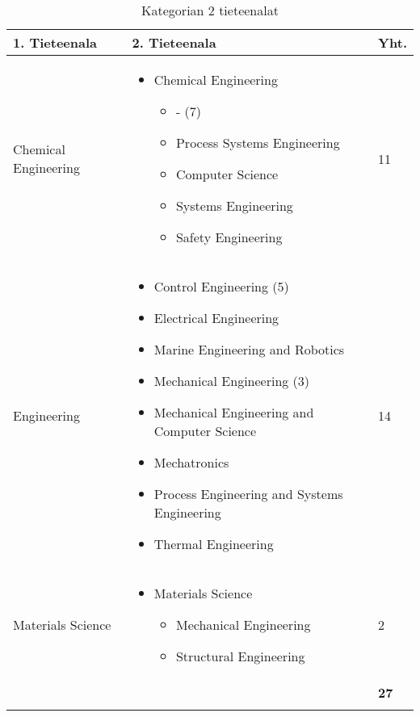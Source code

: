 \documentclass[utf8]{gradu3}
\begin{document}
\begin{longtable}[h]{|p{5cm}|p{8cm}|p{1cm}|}
    \hline
        \textbf{1. Tieteenala}    & \textbf{2. Tieteenala} & \textbf{Yht.} \\
        \hline
        Chemical Engineering    & 
        \begin{itemize}[nosep]
            \item Chemical Engineering 
            \begin{itemize}[nosep]
                \item - (7)
                \item Process Systems Engineering
                \item Computer Science 
                \item Systems Engineering
                \item Safety Engineering
            \end{itemize}
        \end{itemize} & 11 \\
        \hline
        Engineering & 
        \begin{itemize}[nosep]
            \item Control Engineering (5)
            \item Electrical Engineering
            \item Marine Engineering and Robotics
            \item Mechanical Engineering (3)
            \item Mechanical Engineering and Computer Science
            \item Mechatronics
            \item Process Engineering and Systems Engineering
            \item Thermal Engineering
        \end{itemize} & 14 \\
        \hline
        Materials Science & 
        \begin{itemize}[nosep]
            \item Materials Science
            \begin{itemize}[nosep]
                \item Mechanical Engineering
                \item Structural Engineering
            \end{itemize}
        \end{itemize} & 2 \\
    \hline
        &   & \textbf{27} \\
    \hline
    \caption{Kategorian 2 tieteenalat}
    \label{table:Kategorian 2. tieteenalat}
\end{longtable}
\end{document}
